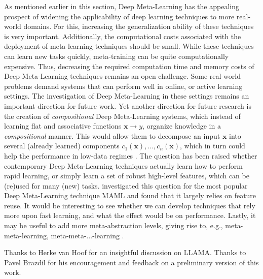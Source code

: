 As mentioned earlier in this section, Deep Meta-Learning has the appealing prospect of widening the applicability of deep learning techniques to more real-world domains. For this, increasing the generalization ability of these techniques is very important. Additionally, the computational costs associated with the deployment of meta-learning techniques should be small. While these techniques can learn new tasks quickly, meta-training can be quite computationally expensive. Thus, decreasing the required computation time and memory costs of Deep Meta-Learning techniques remains an open challenge. 
Some real-world problems demand systems that can perform well in online, or active learning settings. The investigation of Deep Meta-Learning in these settings  remains an important direction for future work.  
Yet another direction for future research is the creation of \textit{compositional} Deep Meta-Learning systems, which instead of learning flat and associative functions $\boldsymbol{x} \rightarrow y$,  organize knowledge in a \textit{compositional} manner. This would allow them to decompose an input $\boldsymbol{x}$ into several (already learned) components $c_{1}(\boldsymbol{x}),\ldots ,c_{n}(\boldsymbol{x})$, which in turn could help the performance in low-data regimes . 
The question has been raised whether contemporary Deep Meta-Learning techniques actually learn how to perform rapid learning, or simply learn a set of robust high-level features, which can be (re)used for many (new) tasks.  investigated this question for the most popular Deep Meta-Learning technique MAML and found that it largely relies on feature reuse. It would be interesting to see whether we can develop techniques that rely more upon fast learning, and what the effect would be on performance.   
Lastly, it may be useful to add more meta-abstraction levels, giving rise to, e.g., meta-meta-learning, meta-meta-...-learning .  
\begin{acknowledgements}
Thanks to Herke van Hoof for an insightful discussion on LLAMA. Thanks to Pavel Brazdil for his encouragement and feedback on a preliminary version of this work.
\end{acknowledgements}
      
   
